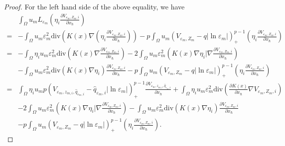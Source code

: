 \documentclass[12pt,reqno]{amsart}
\numberwithin{equation}{section}
\theoremstyle{definition}
\theoremstyle{remark}
\begin{document}
\begin{proof}
For the left hand side of the above equality, we have
\begin{equation*}
\begin{split}
&\int_{\Omega}u_mL_{\varepsilon_m}\left( \eta_i\frac{\partial V_{\varepsilon_m, Z_{m},i}}{\partial x_\hbar}\right) \\
=&-\int_{\Omega}u_m\varepsilon_m^2\text{div}\left (K(x)\nabla \left( \eta_i\frac{\partial V_{\varepsilon_m, Z_{m},i}}{\partial x_\hbar}\right) \right )- p\int_{\Omega}u_m\left (V_{\varepsilon_m, Z_m}-q|\ln\varepsilon_m|\right )^{p-1}_+\left( \eta_i\frac{\partial V_{\varepsilon_m, Z_{m},i}}{\partial x_\hbar}\right)  \\
=&-\int_{\Omega}\eta_iu_m\varepsilon_m^2\text{div}\left (K(x)\nabla \frac{\partial V_{\varepsilon_m, Z_{m},i}}{\partial x_\hbar} \right )-2\int_{\Omega}u_m\varepsilon_m^2\left (K(x)\nabla\eta_i|\nabla   \frac{\partial V_{\varepsilon_m, Z_{m},i}}{\partial x_\hbar}  \right )\\
&-\int_{\Omega}u_m\varepsilon_m^2\text{div}\left (K(x)\nabla   \eta_i  \right )\frac{\partial V_{\varepsilon_m, Z_{m},i}}{\partial x_\hbar}- p\int_{\Omega}u_m\left (V_{\varepsilon_m, Z_m}-q|\ln\varepsilon_m|\right )^{p-1}_+\left( \eta_i\frac{\partial V_{\varepsilon_m, Z_{m},i}}{\partial x_\hbar}\right)
\end{split}
\end{equation*}
\begin{equation}\label{301}
\begin{split}
=&\int_{\Omega}\eta_iu_mp\left( V_{\varepsilon_m, z_{m,i}, \hat{q}_{\varepsilon_m,i}}-\hat{q}_{\varepsilon_m,i}|\ln\varepsilon_m|\right)^{p-1}_+\frac{\partial V_{\varepsilon_m, z_{m,i}, \hat{q}_{\varepsilon_m,i}}}{\partial x_\hbar}+\int_{\Omega}\eta_iu_m\varepsilon_m^2\text{div}\left (\frac{\partial K(x)}{\partial x_\hbar}\nabla V_{\varepsilon_m, Z_{m},i}  \right )\\
&-2\int_{\Omega}u_m\varepsilon_m^2\left (K(x)\nabla\eta_i|\nabla   \frac{\partial V_{\varepsilon_m, Z_{m},i}}{\partial x_\hbar}  \right ) -\int_{\Omega}u_m\varepsilon_m^2\text{div}\left (K(x)\nabla   \eta_i  \right )\frac{\partial V_{\varepsilon_m, Z_{m},i}}{\partial x_\hbar}\\
&- p\int_{\Omega}u_m\left (V_{\varepsilon_m, Z_m}-q|\ln\varepsilon_m|\right )^{p-1}_+\left( \eta_i\frac{\partial V_{\varepsilon_m, Z_{m},i}}{\partial x_\hbar}\right).
\end{split}
\end{equation}


\end{proof}
\end{document}
